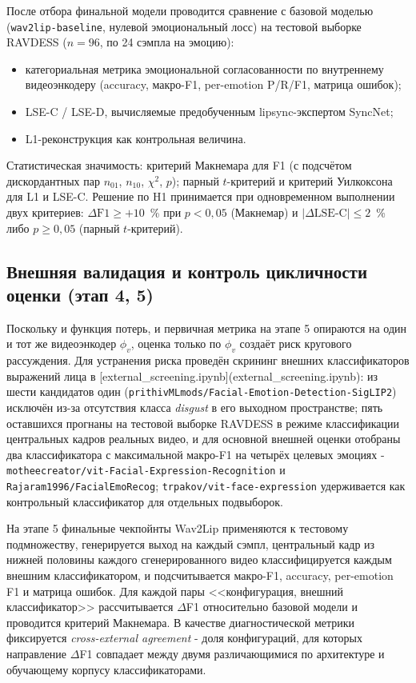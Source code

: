 \documentclass[a4paper, 12pt, oneside, openany]{article}
\begin{document}
После отбора финальной модели проводится сравнение с базовой моделью (\texttt{wav2lip-baseline}, нулевой эмоциональный лосс) на тестовой выборке RAVDESS ($n=96$, по 24 сэмпла на эмоцию):
\begin{itemize}
\item категориальная метрика эмоциональной согласованности по внутреннему видеоэнкодеру (accuracy, макро-F1, per-emotion P/R/F1, матрица ошибок);
\item LSE-C / LSE-D, вычисляемые предобученным lipsync-экспертом SyncNet;
\item L1-реконструкция как контрольная величина.
\end{itemize}
Статистическая значимость: критерий Макнемара для F1 (с подсчётом дискордантных пар $n_{01}$, $n_{10}$, $\chi^2$, $p$); парный $t$-критерий и критерий Уилкоксона для L1 и LSE-C. Решение по H1 принимается при одновременном выполнении двух критериев: $\Delta\text{F1} \geq +10$~\% при $p < 0{,}05$ (Макнемар) и $|\Delta\text{LSE-C}| \leq 2$~\% либо $p \geq 0{,}05$ (парный $t$-критерий).

\subsection{Внешняя валидация и контроль цикличности оценки (этап 4, 5)}

Поскольку и функция потерь, и первичная метрика на этапе 5 опираются на один и тот же видеоэнкодер $\phi_v$, оценка только по $\phi_v$ создаёт риск кругового рассуждения. Для устранения риска проведён скрининг внешних классификаторов выражений лица в [external\_screening.ipynb](external\_screening.ipynb): из шести кандидатов один (\texttt{prithivMLmods/Facial-Emotion-Detection-SigLIP2}) исключён из-за отсутствия класса \textit{disgust} в его выходном пространстве; пять оставшихся прогнаны на тестовой выборке RAVDESS в режиме классификации центральных кадров реальных видео, и для основной внешней оценки отобраны два классификатора с максимальной макро-F1 на четырёх целевых эмоциях - \texttt{motheecreator/vit-Facial-Expression-Recognition} и \texttt{Rajaram1996/FacialEmoRecog}; \texttt{trpakov/vit-face-expression} удерживается как контрольный классификатор для отдельных подвыборок.

На этапе 5 финальные чекпойнты Wav2Lip применяются к тестовому подмножеству, генерируется выход на каждый сэмпл, центральный кадр из нижней половины каждого сгенерированного видео классифицируется каждым внешним классификатором, и подсчитывается макро-F1, accuracy, per-emotion F1 и матрица ошибок. Для каждой пары <<конфигурация, внешний классификатор>> рассчитывается $\Delta$F1 относительно базовой модели и проводится критерий Макнемара. В качестве диагностической метрики фиксируется \textit{cross-external agreement} - доля конфигураций, для которых направление $\Delta$F1 совпадает между двумя различающимися по архитектуре и обучающему корпусу классификаторами.
\end{document}
